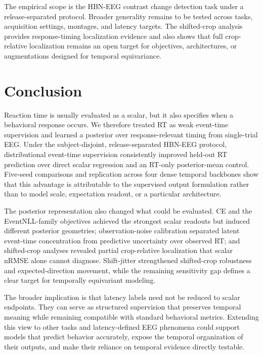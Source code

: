 \documentclass[12pt]{article}
\begin{document}
The empirical scope is the HBN-EEG contrast change detection task under a release-separated protocol. Broader generality remains to be tested across tasks, acquisition settings, montages, and latency targets. The shifted-crop analysis provides response-timing localization evidence and also shows that full crop-relative localization remains an open target for objectives, architectures, or augmentations designed for temporal equivariance.

\section{Conclusion}

Reaction time is usually evaluated as a scalar, but it also specifies when a behavioral response occurs. We therefore treated RT as weak event-time supervision and learned a posterior over response-relevant timing from single-trial EEG. Under the subject-disjoint, release-separated HBN-EEG protocol, distributional event-time supervision consistently improved held-out RT prediction over direct scalar regression and an RT-only posterior-mean control. Five-seed comparisons and replication across four dense temporal backbones show that this advantage is attributable to the supervised output formulation rather than to model scale, expectation readout, or a particular architecture.

The posterior representation also changed what could be evaluated. CE and the EventNLL-family objectives achieved the strongest scalar readouts but induced different posterior geometries; observation-noise calibration separated latent event-time concentration from predictive uncertainty over observed RT; and shifted-crop analyses revealed partial crop-relative localization that scalar nRMSE alone cannot diagnose. Shift-jitter strengthened shifted-crop robustness and expected-direction movement, while the remaining sensitivity gap defines a clear target for temporally equivariant modeling.

The broader implication is that latency labels need not be reduced to scalar endpoints. They can serve as structured supervision that preserves temporal meaning while remaining compatible with standard behavioral metrics. Extending this view to other tasks and latency-defined EEG phenomena could support models that predict behavior accurately, expose the temporal organization of their outputs, and make their reliance on temporal evidence directly testable.

\appendix
\end{document}
